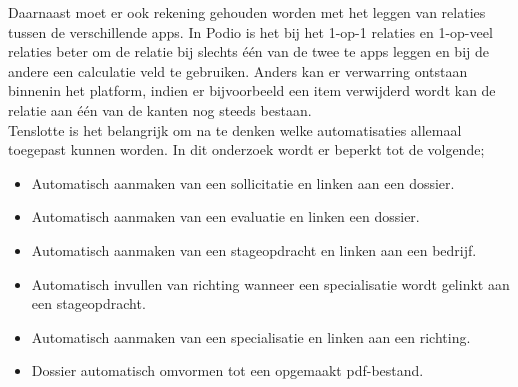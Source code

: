 Daarnaast moet er ook rekening gehouden worden met het leggen van relaties tussen de verschillende apps. In Podio is het bij het 1-op-1 relaties en 1-op-veel relaties beter om de relatie bij slechts één van de twee te apps leggen en bij de andere een calculatie veld te gebruiken. Anders kan er verwarring ontstaan binnenin het platform, indien er bijvoorbeeld een item verwijderd wordt kan de relatie aan één van de kanten nog steeds bestaan. \\

Tenslotte is het belangrijk om na te denken welke automatisaties allemaal toegepast kunnen worden. In dit onderzoek wordt er beperkt tot de volgende;

\begin{itemize}
    \item Automatisch aanmaken van een sollicitatie en linken aan een dossier.
    \item Automatisch aanmaken van een evaluatie en linken een dossier.
    \item Automatisch aanmaken van een stageopdracht en linken aan een bedrijf.
    \item Automatisch invullen van richting wanneer een specialisatie wordt gelinkt aan een stageopdracht.
    \item Automatisch aanmaken van een specialisatie en linken aan een richting.
    \item Dossier automatisch omvormen tot een opgemaakt pdf-bestand.
\end{itemize}

